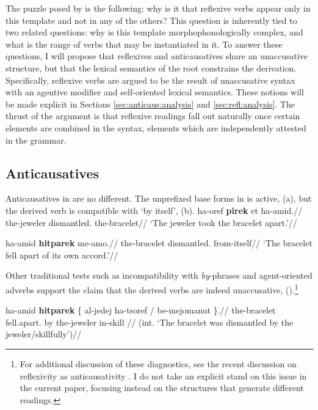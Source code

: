 The puzzle posed by {\thit} is the following: why is it that reflexive verbs appear only in this template and not in any of the others? This question is inherently tied to two related questions: why is this template morphophonologically complex, and what is the range of verbs that may be instantiated in it. To answer these questions, I will propose that reflexives and anticausatives share an unaccusative structure, but that the lexical semantics of the root constrains the derivation. Specifically, reflexive verbs are argued to be the result of unaccusative syntax with an agentive modifier and self-oriented lexical semantics. These notions will be made explicit in Sections \ref{sec:anticaus:analysis} and \ref{sec:refl:analysis}. The thrust of the argument is that reflexive readings fall out naturally once certain elements are combined in the syntax, elements which are independently attested in the grammar.

	\subsection{Anticausatives}

Anticausatives in {\thit} are no different. The unprefixed base forms in {\tpie} is active, (\nextx a), but the derived verb is compatible with `by itself', (\nextx b).
\pex
\a \begingl
\gla ha-{\texttslig}oref \textbf{pirek} et ha-{\texttslig}amid.//
\glb the-jeweler dismantled.  the-bracelet//
\glft `The jeweler took the bracelet apart.'//
\endgl

\a \begingl
\gla ha-{\texttslig}amid \textbf{hitparek} me-a{\texttslig}mo.//
\glb the-bracelet dismantled. from-itself//
\glft `The bracelet fell apart of its own accord.'//
\endgl
\xe

Other traditional tests such as incompatibility with \emph{by}-phrases and agent-oriented adverbs support the claim that the derived verbs are indeed unaccusative, (\nextx).\footnote{For additional discussion of these diagnostics, see the recent discussion on reflexivity as anticausativity \citep{koontzgarboden09,beaverskoontzgarboden13b,beaverskoontzgarboden13a,horvathsiloni11,horvathsiloni13,lundquistetal16,schaefervivanco16}. I do not take an explicit stand on this issue in the current paper, focusing instead on the structures that generate different readings.}

\ex \ljudge{*} \begingl
\gla ha-{\texttslig}amid \textbf{hitparek} \{ al-jedej ha-tsoref / be-mejomanut \}.//
\glb the-bracelet fell.apart. {} by the-jeweler {} in-skill {}//
\glft (int. `The bracelet was dismantled by the jeweler/skillfully')//
\endgl
\xe


